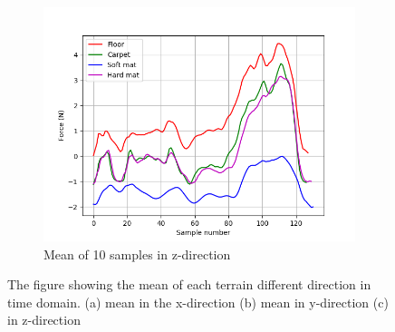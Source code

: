 \documentclass[USenglish]{ifimaster}  %
\begin{document}
	\begin{figure}[h] \ContinuedFloat
		\begin{subfigure}[b]{0.95\textwidth}
			\includegraphics[width=\textwidth,height=\textheight,keepaspectratio]{Figures/meanz}
			\caption{Mean of 10 samples in z-direction}
			\label{fig:meanz}
		\end{subfigure}
		
		\caption[]{The figure showing the mean of each terrain different direction in time domain. (a) mean in the x-direction (b) mean in y-direction (c) in z-direction }
		\label{fig:meanxyz}
	\end{figure}
	
\end{document}
